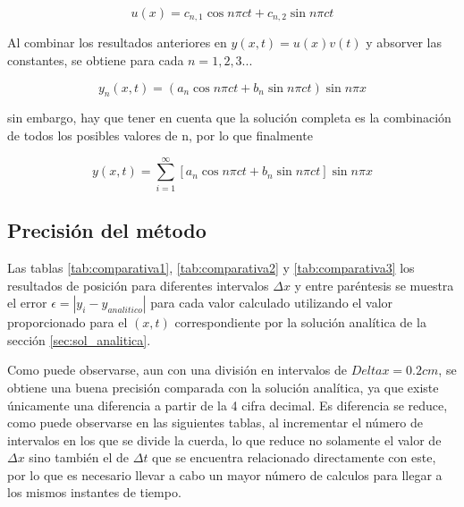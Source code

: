 \documentclass[11pt]{article}
\begin{document}
\begin{equation}
	u(x) = c_{n,1}\cos{n\pi{c}t} + c_{n,2}\sin{n\pi{c}t}
\end{equation}

Al combinar los resultados anteriores en $y(x,t) = u(x)v(t)$ y absorver las constantes, se
obtiene para cada $n = 1, 2, 3 ...$

\begin{equation}
	y_n(x,t) = (a_n\cos{n\pi{c}t} + b_n\sin{n\pi{c}t})\sin{n\pi{x}}
\end{equation}

sin embargo, hay que tener en cuenta que la solución completa es la combinación de todos
los posibles valores de n, por lo que finalmente

\begin{equation}
	y(x,t) = \sum\limits_{i=1}^\infty[a_n\cos{n\pi{c}t} + b_n\sin{n\pi{c}t}]\sin{n\pi{x}}
\end{equation}

\subsection{Precisión del método}

Las tablas \ref{tab:comparativa1}, \ref{tab:comparativa2} y \ref{tab:comparativa3} los
resultados de posición para diferentes intervalos $\Delta{x}$ y entre paréntesis se muestra
el error $\epsilon = |y_i - y_{analitico}|$ para cada valor calculado utilizando el valor
proporcionado para el $(x,t)$ correspondiente por la solución analítica de la sección 
\ref{sec:sol_analitica}.

Como puede observarse, aun con una división en intervalos de $Delta{x} = 0.2 cm$, se 
obtiene una buena precisión comparada con la solución analítica, ya que existe únicamente
una diferencia a partir de la 4 cifra decimal. Es diferencia se reduce, como puede
observarse en las siguientes tablas, al incrementar el número de intervalos en los que se
divide la cuerda, lo que reduce no solamente el valor de $\Delta{x}$ sino también el de
$\Delta{t}$ que se encuentra relacionado directamente con este, por lo que es necesario
llevar a cabo un mayor número de calculos para llegar a los mismos instantes de tiempo.
\end{document}
